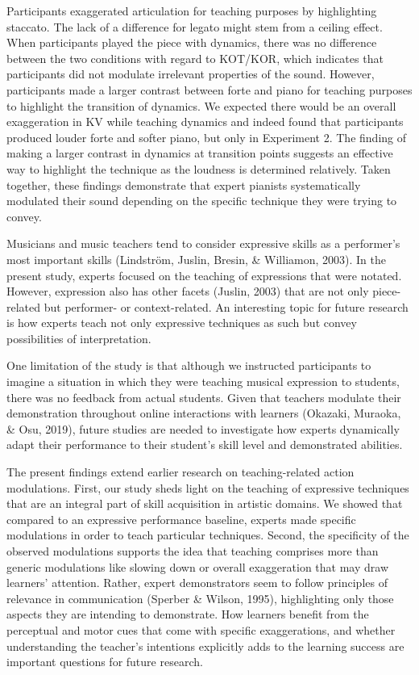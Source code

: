 \documentclass[
  english,
  man,floatsintext]{apa6}
\begin{document}
Participants exaggerated articulation for teaching purposes by highlighting staccato. The lack of a difference for legato might stem from a ceiling effect. When participants played the piece with dynamics, there was no difference between the two conditions with regard to KOT/KOR, which indicates that participants did not modulate irrelevant properties of the sound. However, participants made a larger contrast between forte and piano for teaching purposes to highlight the transition of dynamics. We expected there would be an overall exaggeration in KV while teaching dynamics and indeed found that participants produced louder forte and softer piano, but only in Experiment 2. The finding of making a larger contrast in dynamics at transition points suggests an effective way to highlight the technique as the loudness is determined relatively. Taken together, these findings demonstrate that expert pianists systematically modulated their sound depending on the specific technique they were trying to convey.

Musicians and music teachers tend to consider expressive skills as a performer's most important skills (Lindström, Juslin, Bresin, \& Williamon, 2003). In the present study, experts focused on the teaching of expressions that were notated. However, expression also has other facets (Juslin, 2003) that are not only piece-related but performer- or context-related. An interesting topic for future research is how experts teach not only expressive techniques as such but convey possibilities of interpretation.

One limitation of the study is that although we instructed participants to imagine a situation in which they were teaching musical expression to students, there was no feedback from actual students. Given that teachers modulate their demonstration throughout online interactions with learners (Okazaki, Muraoka, \& Osu, 2019), future studies are needed to investigate how experts dynamically adapt their performance to their student's skill level and demonstrated abilities.

The present findings extend earlier research on teaching-related action modulations. First, our study sheds light on the teaching of expressive techniques that are an integral part of skill acquisition in artistic domains. We showed that compared to an expressive performance baseline, experts made specific modulations in order to teach particular techniques. Second, the specificity of the observed modulations supports the idea that teaching comprises more than generic modulations like slowing down or overall exaggeration that may draw learners' attention. Rather, expert demonstrators seem to follow principles of relevance in communication (Sperber \& Wilson, 1995), highlighting only those aspects they are intending to demonstrate. How learners benefit from the perceptual and motor cues that come with specific exaggerations, and whether understanding the teacher's intentions explicitly adds to the learning success are important questions for future research.
\end{document}
